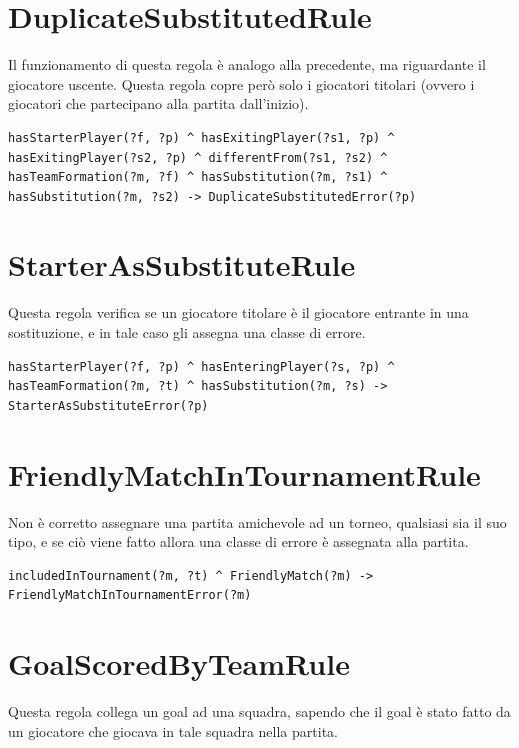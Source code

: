 \documentclass[11pt]{report} %
\begin{document}
\section{DuplicateSubstitutedRule}

Il funzionamento di questa regola è analogo alla precedente, ma riguardante il giocatore uscente.
Questa regola copre però solo i giocatori titolari (ovvero i giocatori che partecipano alla partita dall'inizio).

\begin{lstlisting}[language=SWRL]
hasStarterPlayer(?f, ?p) ^ hasExitingPlayer(?s1, ?p) ^ hasExitingPlayer(?s2, ?p) ^ differentFrom(?s1, ?s2) ^ hasTeamFormation(?m, ?f) ^ hasSubstitution(?m, ?s1) ^ hasSubstitution(?m, ?s2) -> DuplicateSubstitutedError(?p)
\end{lstlisting}

\section{StarterAsSubstituteRule}

Questa regola verifica se un giocatore titolare è il giocatore entrante in una sostituzione, e in tale caso gli assegna una classe di errore.

\begin{lstlisting}[language=SWRL]
hasStarterPlayer(?f, ?p) ^ hasEnteringPlayer(?s, ?p) ^ hasTeamFormation(?m, ?t) ^ hasSubstitution(?m, ?s) -> StarterAsSubstituteError(?p)
\end{lstlisting}

\section{FriendlyMatchInTournamentRule}

Non è corretto assegnare una partita amichevole ad un torneo, qualsiasi sia il suo tipo, e se ciò viene fatto allora una classe di errore è assegnata alla partita. 

\begin{lstlisting}[language=SWRL]
includedInTournament(?m, ?t) ^ FriendlyMatch(?m) -> FriendlyMatchInTournamentError(?m)
\end{lstlisting}

\section{GoalScoredByTeamRule}

Questa regola collega un goal ad una squadra, sapendo che il goal è stato fatto da un giocatore che giocava in tale squadra nella partita.
\end{document}
